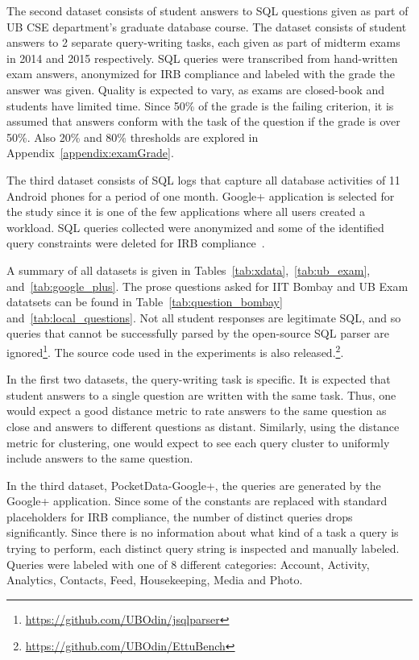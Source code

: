 The second dataset consists of student answers to SQL questions given as part of UB CSE department's graduate database course.
The dataset consists of student answers to 2 separate query-writing tasks, each given as part of midterm exams in 2014 and 2015 respectively.
SQL queries were transcribed from hand-written exam answers, anonymized for IRB compliance and labeled with the grade the answer was given.
Quality is expected to vary, as exams are closed-book and students have limited time. 
Since 50\% of the grade is the failing criterion, it is assumed that answers conform with the task of the question if the grade is over 50\%. Also 20\% and 80\% thresholds are explored in Appendix~\ref{appendix:examGrade}.

The third dataset consists of SQL logs that capture all database activities of 11 Android phones for a period of one month.
Google+ application is selected for the study since it is one of the few applications where all users created a workload.
SQL queries collected were anonymized and some of the identified query constraints were deleted for IRB compliance~\cite{pocketdata}.

A summary of all datasets is given in Tables~\ref{tab:xdata},~\ref{tab:ub_exam}, and~\ref{tab:google_plus}.
The prose questions asked for IIT Bombay and UB Exam datatsets can be found in Table~\ref{tab:question_bombay} and~\ref{tab:local_questions}.
Not all student responses are legitimate SQL, and so queries that cannot be successfully parsed by the open-source SQL parser are ignored\footnote{
\url{https://github.com/UBOdin/jsqlparser}
}. The source code used in the experiments is also released.\footnote{ 
\url{https://github.com/UBOdin/EttuBench}
}.

In the first two datasets, the query-writing task is specific.
It is expected that student answers to a single question are written with the same task.
Thus, one would expect a good distance metric to rate answers to the same question as close and answers to different questions as distant.
Similarly, using the distance metric for clustering, one would expect to see each query cluster to uniformly include answers to the same question.

In the third dataset, PocketData-Google+, the queries are generated by the Google+ application. 
Since some of the constants are replaced with standard placeholders for IRB compliance, the number of distinct queries drops significantly. 
Since there is no information about what kind of a task a query is trying to perform, each distinct query string is inspected and manually labeled. 
Queries were labeled with one of 8 different categories: Account, Activity, Analytics, Contacts, Feed, Housekeeping, Media and Photo.

